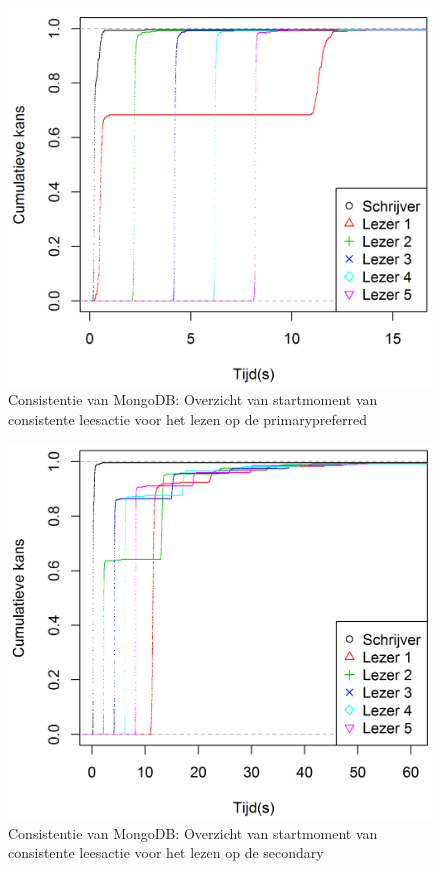 \begin{figure}[htb!] 
	\centering
	\includegraphics[width=.70\textwidth]{img/Observaties/MongoDB/ECDF-plot-Start-updateRawData-majority-primarypreferred-1}
	\caption{Consistentie van MongoDB: Overzicht van startmoment van consistente leesactie voor het lezen op de primarypreferred }
	\label{fig:consistentie-mongodb-primarypreferred}
\end{figure}
\begin{figure}[htb!] 
	\centering
	\includegraphics[width=.70\textwidth]{img/Observaties/MongoDB/ECDF-plot-Start-updateRawData-majority-secondary-1}
	\caption{Consistentie van MongoDB: Overzicht van startmoment van consistente leesactie voor het lezen op de secondary }
	\label{fig:consistentie-mongodb-secondary}
\end{figure}
